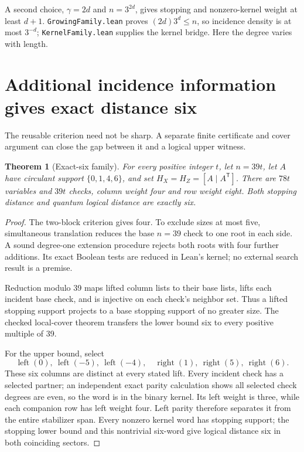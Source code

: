 \documentclass[11pt]{article}
\newtheorem{theorem}{Theorem}
\begin{document}
A second choice, $\gamma=2d$ and $n=3^{2d}$, gives stopping and nonzero-kernel
weight at least $d+1$. \texttt{GrowingFamily.lean} proves
$(2d)3^d\le n$, so incidence density is at most $3^{-d}$;
\texttt{KernelFamily.lean} supplies the kernel bridge. Here the degree varies
with length.

\section{Additional incidence information gives exact distance six}
\label{sec:six}
The reusable criterion need not be sharp. A separate finite certificate and
cover argument can close the gap between it and a logical upper witness.

\begin{theorem}[Exact-six family]\label{thm:six}
For every positive integer $t$, let $n=39t$, let $A$ have circulant support
$\{0,1,4,6\}$, and set $H_X=H_Z=[A\mid A^{\mathsf T}]$.
There are $78t$ variables and $39t$ checks, column weight four and row weight
eight. Both stopping distance and quantum logical distance are exactly six.
\end{theorem}
\begin{proof}
The two-block criterion gives four. To exclude sizes at most five, simultaneous
translation reduces the base $n=39$ check to one root in each side.
A sound degree-one extension procedure rejects both roots with four further
additions. Its exact Boolean tests are reduced in Lean's kernel; no external
search result is a premise.

Reduction modulo 39 maps lifted column lists to their base lists, lifts each
incident base check, and is injective on each check's neighbor set. Thus a
lifted stopping support projects to a base stopping support of no greater size.
The checked local-cover theorem transfers the lower bound six to every
positive multiple of 39.

For the upper bound, select
\[
 \operatorname{left}(0),\ \operatorname{left}(-5),\ \operatorname{left}(-4),\quad
 \operatorname{right}(1),\ \operatorname{right}(5),\ \operatorname{right}(6).
\]
These six columns are distinct at every stated lift. Every incident check has
a selected partner; an independent exact parity calculation shows all selected
check degrees are even, so the word is in the binary kernel. Its left weight
is three, while each companion row has left weight four. Left parity therefore
separates it from the entire stabilizer span. Every nonzero kernel word has
stopping support; the stopping lower bound and this nontrivial six-word give
logical distance six in both coinciding sectors.
\end{proof}
\end{document}
